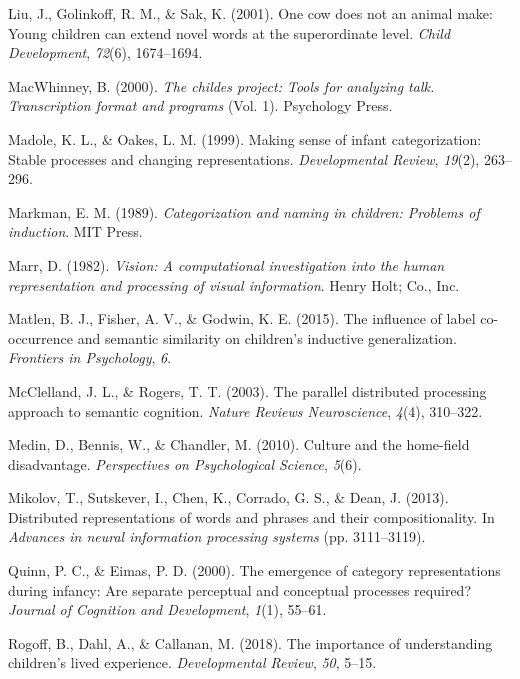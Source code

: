 \documentclass[english,,man,floatsintext]{apa6}
\begin{document}
\leavevmode\hypertarget{ref-liu2001}{}%
Liu, J., Golinkoff, R. M., \& Sak, K. (2001). One cow does not an animal make: Young children can extend novel words at the superordinate level. \emph{Child Development}, \emph{72}(6), 1674--1694.

\leavevmode\hypertarget{ref-macwhinney2000}{}%
MacWhinney, B. (2000). \emph{The childes project: Tools for analyzing talk. Transcription format and programs} (Vol. 1). Psychology Press.

\leavevmode\hypertarget{ref-madole1999}{}%
Madole, K. L., \& Oakes, L. M. (1999). Making sense of infant categorization: Stable processes and changing representations. \emph{Developmental Review}, \emph{19}(2), 263--296.

\leavevmode\hypertarget{ref-markman1989}{}%
Markman, E. M. (1989). \emph{Categorization and naming in children: Problems of induction}. MIT Press.

\leavevmode\hypertarget{ref-marr1982}{}%
Marr, D. (1982). \emph{Vision: A computational investigation into the human representation and processing of visual information}. Henry Holt; Co., Inc.

\leavevmode\hypertarget{ref-matlen2015}{}%
Matlen, B. J., Fisher, A. V., \& Godwin, K. E. (2015). The influence of label co-occurrence and semantic similarity on children's inductive generalization. \emph{Frontiers in Psychology}, \emph{6}.

\leavevmode\hypertarget{ref-mcclelland2003}{}%
McClelland, J. L., \& Rogers, T. T. (2003). The parallel distributed processing approach to semantic cognition. \emph{Nature Reviews Neuroscience}, \emph{4}(4), 310--322.

\leavevmode\hypertarget{ref-medin2010}{}%
Medin, D., Bennis, W., \& Chandler, M. (2010). Culture and the home-field disadvantage. \emph{Perspectives on Psychological Science}, \emph{5}(6).

\leavevmode\hypertarget{ref-mikolov2013}{}%
Mikolov, T., Sutskever, I., Chen, K., Corrado, G. S., \& Dean, J. (2013). Distributed representations of words and phrases and their compositionality. In \emph{Advances in neural information processing systems} (pp. 3111--3119).

\leavevmode\hypertarget{ref-quinn2000}{}%
Quinn, P. C., \& Eimas, P. D. (2000). The emergence of category representations during infancy: Are separate perceptual and conceptual processes required? \emph{Journal of Cognition and Development}, \emph{1}(1), 55--61.

\leavevmode\hypertarget{ref-rogoff2018}{}%
Rogoff, B., Dahl, A., \& Callanan, M. (2018). The importance of understanding children's lived experience. \emph{Developmental Review}, \emph{50}, 5--15.
\end{document}
